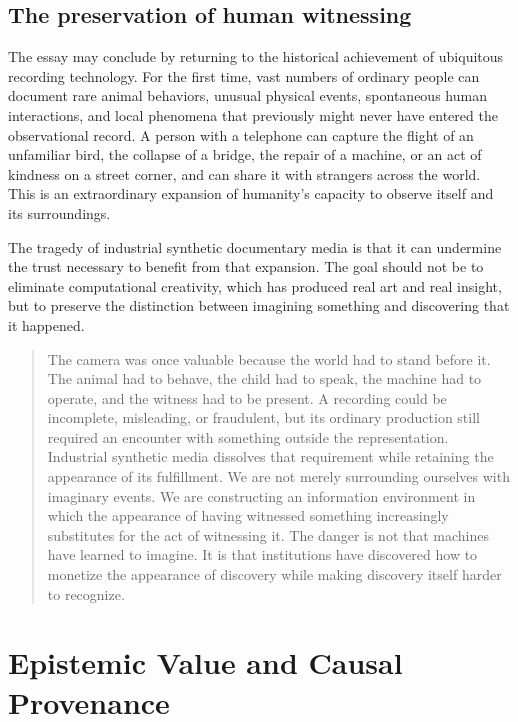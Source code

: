 \documentclass[12pt]{article}
\theoremstyle{plain}
\theoremstyle{definition}
\theoremstyle{remark}
\begin{document}
\subsection{The preservation of human witnessing}

The essay may conclude by returning to the historical achievement of ubiquitous recording technology. For the first time, vast numbers of ordinary people can document rare animal behaviors, unusual physical events, spontaneous human interactions, and local phenomena that previously might never have entered the observational record. A person with a telephone can capture the flight of an unfamiliar bird, the collapse of a bridge, the repair of a machine, or an act of kindness on a street corner, and can share it with strangers across the world. This is an extraordinary expansion of humanity's capacity to observe itself and its surroundings.

The tragedy of industrial synthetic documentary media is that it can undermine the trust necessary to benefit from that expansion. The goal should not be to eliminate computational creativity, which has produced real art and real insight, but to preserve the distinction between imagining something and discovering that it happened.

\begin{quote}
The camera was once valuable because the world had to stand before it. The animal had to behave, the child had to speak, the machine had to operate, and the witness had to be present. A recording could be incomplete, misleading, or fraudulent, but its ordinary production still required an encounter with something outside the representation. Industrial synthetic media dissolves that requirement while retaining the appearance of its fulfillment. We are not merely surrounding ourselves with imaginary events. We are constructing an information environment in which the appearance of having witnessed something increasingly substitutes for the act of witnessing it. The danger is not that machines have learned to imagine. It is that institutions have discovered how to monetize the appearance of discovery while making discovery itself harder to recognize.
\end{quote}

\appendix

\section{Epistemic Value and Causal Provenance}
\end{document}
